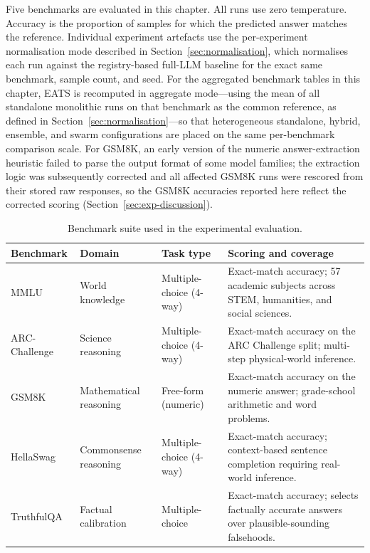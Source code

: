 Five benchmarks are evaluated in this chapter. All runs use zero temperature. Accuracy is the proportion of samples for which the predicted answer matches the reference. Individual experiment artefacts use the per-experiment normalisation mode described in Section~\ref{sec:normalisation}, which normalises each run against the registry-based full-LLM baseline for the exact same benchmark, sample count, and seed. For the aggregated benchmark tables in this chapter, EATS is recomputed in aggregate mode---using the mean of all standalone monolithic runs on that benchmark as the common reference, as defined in Section~\ref{sec:normalisation}---so that heterogeneous standalone, hybrid, ensemble, and swarm configurations are placed on the same per-benchmark comparison scale. For GSM8K, an early version of the numeric answer-extraction heuristic failed to parse the output format of some model families; the extraction logic was subsequently corrected and all affected GSM8K runs were rescored from their stored raw responses, so the GSM8K accuracies reported here reflect the corrected scoring (Section~\ref{sec:exp-discussion}).

\begin{table}[htbp]
    \centering
    \caption{Benchmark suite used in the experimental evaluation.}
    \label{tab:benchmark-suite}
    \small
    \begin{tabularx}{\linewidth}{@{} l l l X @{}}
        \toprule
        \textbf{Benchmark} & \textbf{Domain} & \textbf{Task type} & \textbf{Scoring and coverage} \\
        \midrule
        MMLU & World knowledge & Multiple-choice (4-way) & Exact-match accuracy; 57 academic subjects across STEM, humanities, and social sciences. \\
        ARC-Challenge & Science reasoning & Multiple-choice (4-way) & Exact-match accuracy on the ARC Challenge split; multi-step physical-world inference. \\
        GSM8K & Mathematical reasoning & Free-form (numeric) & Exact-match accuracy on the numeric answer; grade-school arithmetic and word problems. \\
        HellaSwag & Commonsense reasoning & Multiple-choice (4-way) & Exact-match accuracy; context-based sentence completion requiring real-world inference. \\
        TruthfulQA & Factual calibration & Multiple-choice & Exact-match accuracy; selects factually accurate answers over plausible-sounding falsehoods. \\
        \bottomrule
    \end{tabularx}
\end{table}

